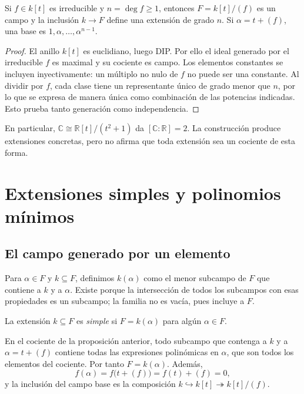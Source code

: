 \begin{prop}\label{prop:C22-grado-cociente}
Si $f\in k[t]$ es irreducible y $n=\deg f\geq1$, entonces $F=k[t]/(f)$ es un campo y la inclusión $k\to F$ define una extensión de grado $n$. Si $\alpha=t+(f)$, una base es $1,\alpha,\ldots,\alpha^{n-1}$.
\end{prop}
\begin{proof}
El anillo $k[t]$ es euclidiano, luego DIP. Por ello el ideal generado por el irreducible $f$ es maximal y su cociente es campo. Los elementos constantes se incluyen inyectivamente: un múltiplo no nulo de $f$ no puede ser una constante. Al dividir por $f$, cada clase tiene un representante único de grado menor que $n$, por lo que se expresa de manera única como combinación de las potencias indicadas. Esto prueba tanto generación como independencia.
\end{proof}
En particular, $\mathbb C\cong\mathbb R[t]/(t^2+1)$ da $[\mathbb C:\mathbb R]=2$. La construcción produce extensiones concretas, pero no afirma que toda extensión sea un cociente de esta forma.

\section{Extensiones simples y polinomios mínimos}
\subsection{El campo generado por un elemento}
Para $\alpha\in F$ y $k\subseteq F$, definimos $k(\alpha)$ como el menor subcampo de $F$ que contiene a $k$ y a $\alpha$. Existe porque la intersección de todos los subcampos con esas propiedades es un subcampo; la familia no es vacía, pues incluye a $F$.
\begin{defi}
La extensión $k\subseteq F$ es \emph{simple} si $F=k(\alpha)$ para algún $\alpha\in F$.
\end{defi}
En el cociente de la proposición anterior, todo subcampo que contenga a $k$ y a $\alpha=t+(f)$ contiene todas las expresiones polinómicas en $\alpha$, que son todos los elementos del cociente. Por tanto $F=k(\alpha)$. Además,
\[
f(\alpha)=f\bigl(t+(f)\bigr)=f(t)+(f)=0,
\]
y la inclusión del campo base es la composición $k\hookrightarrow k[t]\twoheadrightarrow k[t]/(f)$.

